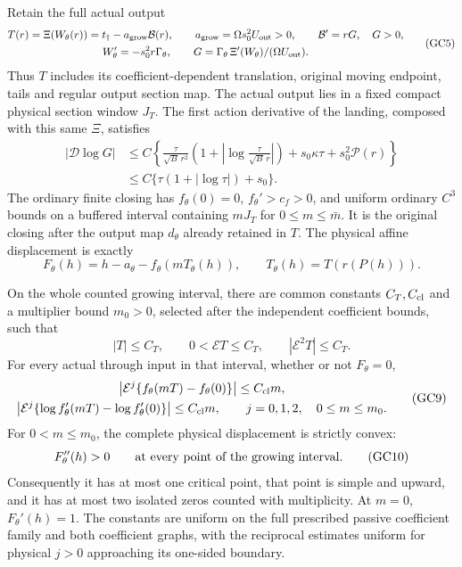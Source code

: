 Retain the full actual output
\[
 \begin{gathered}
 T(r)=\Xi(W_\theta(r))
      =t_\dagger-a_{\rm grow}\mathcal B(r),\qquad
 a_{\rm grow}=\Omega s_0^2U_{\rm out}>0,\qquad
 \mathcal B'=rG,\quad G>0,\\
 W_\theta'=-s_0^2r\Gamma_\theta,\qquad
 G=\Gamma_\theta\,\Xi'(W_\theta)/(\Omega U_{\rm out}) .
 \end{gathered}
 \tag{GC5}
\]
Thus $T$ includes its coefficient-dependent translation, original
moving endpoint, tails and regular output section map.
The actual output lies in a fixed compact physical section window $J_T$.
The first action derivative of the landing, composed with this same
$\Xi$, satisfies
\[
 \begin{split}
 |\mathcal D\log G|
 &\le C\left\{
 \frac{\tau}{\sqrt B\,r^2}
       \left(1+\left|\log\frac{\tau}{\sqrt B\,r}\right|\right)
       +s_0\kappa\tau+s_0^2\mathcal P(r)\right\}\\
 &\le C\{\tau(1+|\log\tau|)+s_0\}.
 \end{split}
 \tag{GC6}
\]
The ordinary finite closing has $f_\theta(0)=0$, $f_\theta'>c_f>0$,
and uniform ordinary $C^3$ bounds on a buffered interval containing
$mJ_T$ for $0\le m\le\bar m$. It is the original closing after the
output map $d_\theta$ already retained in $T$.
The physical affine displacement is exactly
\[
 F_\theta(h)=h-a_\theta-f_\theta(mT_\theta(h)),\qquad
 T_\theta(h)=T(r(P(h))).
 \tag{GC7}
\]

\begin{proposition}
\label{p2:prop-growing-physical-count}
On the whole counted growing interval, there are common constants
$C_T,C_{\rm cl}$ and a multiplier bound $m_0>0$, selected after the
independent coefficient bounds, such that
\[
 |T|\le C_T,\qquad 0<\mathcal ET\le C_T,\qquad
 |\mathcal E^2T|\le C_T .
 \tag{GC8}
\]
For every actual through input in that interval, whether or not
$F_\theta=0$,
\[
 \begin{gathered}
 \left|\mathcal E^j\{f_\theta(mT)-f_\theta(0)\}\right|
       \le C_{\rm cl}m,\\
 \left|\mathcal E^j\{\log f_\theta'(mT)-\log f_\theta'(0)\}\right|
       \le C_{\rm cl}m,\qquad j=0,1,2,\quad 0\le m\le m_0 .
 \end{gathered}
 \tag{GC9}
\]
For $0<m\le m_0$, the complete physical displacement is strictly convex:
\[
 F_\theta''(h)>0\qquad\hbox{at every point of the growing interval}.
 \tag{GC10}
\]
Consequently it has at most one critical point, that point is simple
and upward, and it has at most two isolated zeros counted with
multiplicity. At $m=0$, $F_\theta'(h)=1$.
The constants are uniform on the full prescribed passive coefficient
family and both coefficient graphs, with the reciprocal estimates
uniform for physical $j>0$ approaching its one-sided boundary.
\end{proposition}

